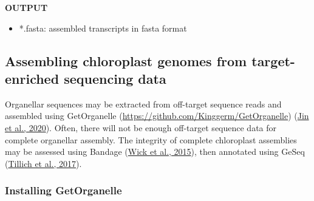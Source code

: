 \documentclass[
  12pt,
]{article}
\newenvironment{Shaded}{\begin{snugshade}}{\end{snugshade}}
\newcommand{\AttributeTok}[1]{\textcolor[rgb]{0.13,0.29,0.53}{#1}}
\newcommand{\BuiltInTok}[1]{#1}
\newcommand{\CommentTok}[1]{\textcolor[rgb]{0.56,0.35,0.01}{\textit{#1}}}
\newcommand{\ControlFlowTok}[1]{\textcolor[rgb]{0.13,0.29,0.53}{\textbf{#1}}}
\newcommand{\ExtensionTok}[1]{#1}
\newcommand{\FunctionTok}[1]{\textcolor[rgb]{0.13,0.29,0.53}{\textbf{#1}}}
\newcommand{\KeywordTok}[1]{\textcolor[rgb]{0.13,0.29,0.53}{\textbf{#1}}}
\newcommand{\NormalTok}[1]{#1}
\newcommand{\OperatorTok}[1]{\textcolor[rgb]{0.81,0.36,0.00}{\textbf{#1}}}
\newcommand{\StringTok}[1]{\textcolor[rgb]{0.31,0.60,0.02}{#1}}
\newcommand{\VariableTok}[1]{\textcolor[rgb]{0.00,0.00,0.00}{#1}}
\providecommand{\tightlist}{%
  \setlength{\itemsep}{0pt}\setlength{\parskip}{0pt}}
\begin{document}
\begin{Shaded}
\end{Shaded}

\textbf{OUTPUT}

\begin{itemize}
\tightlist
\item
  *.fasta: assembled transcripts in fasta format
\end{itemize}

\hypertarget{assembling-chloroplast-genomes-from-target-enriched-sequencing-data}{%
\subsection{Assembling chloroplast genomes from target-enriched sequencing data}\label{assembling-chloroplast-genomes-from-target-enriched-sequencing-data}}

Organellar sequences may be extracted from off-target sequence reads and assembled using GetOrganelle (\url{https://github.com/Kinggerm/GetOrganelle}) (\protect\hyperlink{ref-Jin2020}{Jin et al., 2020}). Often, there will not be enough off-target sequence data for complete organellar assembly. The integrity of complete chloroplast assemblies may be assessed using Bandage (\protect\hyperlink{ref-Wick2015}{Wick et al., 2015}), then annotated using GeSeq (\protect\hyperlink{ref-Tillich2017}{Tillich et al., 2017}).

\hypertarget{installing-getorganelle}{%
\subsubsection{Installing GetOrganelle}\label{installing-getorganelle}}
\end{document}
